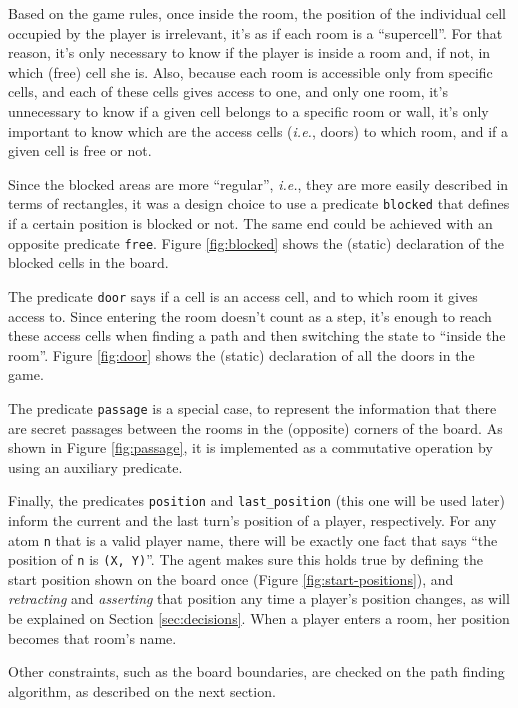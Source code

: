 \documentclass[12pt,a4paper]{article}
\newcommand{\varname}[1]{\texttt{#1}}
\newcommand{\predname}[1]{{\color{MidnightBlue}\varname{#1}}}
\begin{document}
Based on the game rules, once inside the room, the position of the individual cell occupied by the player is irrelevant, it's as if each room is a ``supercell''. For that reason, it's only necessary to know if the player is inside a room and, if not, in which (free) cell she is. Also, because each room is accessible only from specific cells, and each of these cells gives access to one, and only one room, it's unnecessary to know if a given cell belongs to a specific room or wall, it's only important to know which are the access cells (\textit{i.e.}, doors) to which room, and if a given cell is free or not.

Since the blocked areas are more ``regular'', \textit{i.e.}, they are more easily described in terms of rectangles, it was a design choice to use a predicate \predname{blocked} that defines if a certain position is blocked or not. The same end could be achieved with an opposite predicate \predname{free}. Figure \ref{fig:blocked} shows the (static) declaration of the blocked cells in the board.

The predicate \predname{door} says if a cell is an access cell, and to which room it gives access to. Since entering the room doesn't count as a step, it's enough to reach these access cells when finding a path and then switching the state to ``inside the room''. Figure \ref{fig:door} shows the (static) declaration of all the doors in the game.

The predicate \predname{passage} is a special case, to represent the information that there are secret passages between the rooms in the (opposite) corners of the board. As shown in Figure \ref{fig:passage}, it is implemented as a commutative operation by using an auxiliary predicate.

Finally, the predicates \predname{position} and \predname{last\_position} (this one will be used later) inform the current and the last turn's position of a player, respectively. For any atom \varname{n} that is a valid player name, there will be exactly one fact that says ``the position of \varname{n} is \varname{(X, Y)}''. The agent makes sure this holds true by defining the start position shown on the board once (Figure \ref{fig:start-positions}), and \textit{retracting} and \textit{asserting} that position any time a player's position changes, as will be explained on Section \ref{sec:decisions}. When a player enters a room, her position becomes that room's name.

Other constraints, such as the board boundaries, are checked on the path finding algorithm, as described on the next section.
\end{document}
